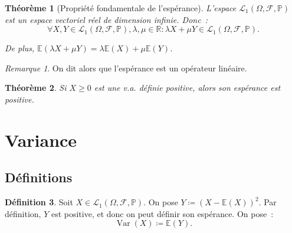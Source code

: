 \documentclass{article}
\newcommand{\E}{\mathbb E}
\renewcommand{\P}{\mathbb P}
\newcommand{\R}{\mathbb R}
\newcommand{\espproba}[3]{\left(#1, #2, #3\right)}
\newcommand{\Ofp}{\espproba \Omega{\mathcal F}\P}
\newcommand{\Lu}{\mathcal L_1\Ofp}
\DeclareMathOperator{\Var}{Var}
\newtheorem{thm}{Théorème}[section]
\theoremstyle{definition}
\newtheorem{déf}[thm]{Définition}
\theoremstyle{remark}
\newtheorem*{rmq}{Remarque}
\begin{document}
		\begin{thm}[Propriété fondamentale de l'espérance] L'espace $\Lu$ est un espace vectoriel réel de dimension infinie. Donc~:
		\[\forall X, Y \in \Lu, \lambda, \mu \in \R : \lambda X + \mu Y \in \Lu.\]

		De plus, $\E(\lambda X + \mu Y) = \lambda \E(X) + \mu \E(Y)$.
		\end{thm}

		\begin{rmq} On dit alors que l'espérance est un opérateur linéaire. \end{rmq}

		\begin{thm} Si $X \geq 0$ est une v.a. définie positive, alors son espérance est positive. \end{thm}

\newpage
\section{Variance}
	\subsection{Définitions}
		\begin{déf} Soit $X \in \Lu$. On pose $Y \coloneqq (X - \E(X))^2$. Par définition, $Y$ est positive, et donc on peut définir son espérance. On pose~:
		\begin{equation}
			\Var(X) \coloneqq \E(Y).
		\end{equation}
		\end{déf}
\end{document}
